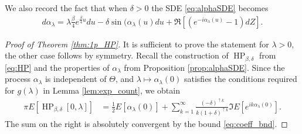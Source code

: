 \documentclass[12pt]{article}
\theoremstyle{definition} %
\theoremstyle{remark} %
\newcommand{\HPb}{\operatorname{HP}_{\beta, \delta}}
\begin{document}
We also record the fact that when  $\delta>0$ the SDE \eqref{eq:alphaSDE} becomes
\begin{align}
    \label{eq:alphaSDE11}
	d\alpha_\lambda = \lambda\tfrac{\beta}{4}e^{\frac{\beta}{4}u} du -\delta \sin(\alpha_\lambda(u) du+\Re[(e^{-i\alpha_\lambda(u)}-1)dZ].
\end{align}




\begin{proof}[Proof of Theorem \ref{thm:1p_HP}]
It is sufficient to prove the statement for $\lambda>0$, the other case follows by symmetry.  Recall the construction of $\HPb$ from \eqref{eq:HP} and the properties of $\alpha_\lambda$ from Proposition \ref{prop:alphaSDE}.
Since the process $\alpha_\lambda$ is independent of $\Theta$, and $\lambda\mapsto \alpha_\lambda(0)$ satisfies the  conditions required for $g(\lambda)$ in Lemma \ref{lem:exp_count}, 
we obtain
\begin{align}
  \pi  E[\HPb[0,\lambda]]&=\frac12 E[\alpha_\lambda(0)]+\sum_{k=1}^\infty \frac{(-\delta)^{\uparrow k}}{k (1+\delta)^{\uparrow k}}  \Im E[e^{i k \alpha_\lambda(0)}].
\end{align}
The sum on the right is absolutely convergent by the bound \eqref{eq:coeff_bnd}.



\end{proof}
\end{document}
